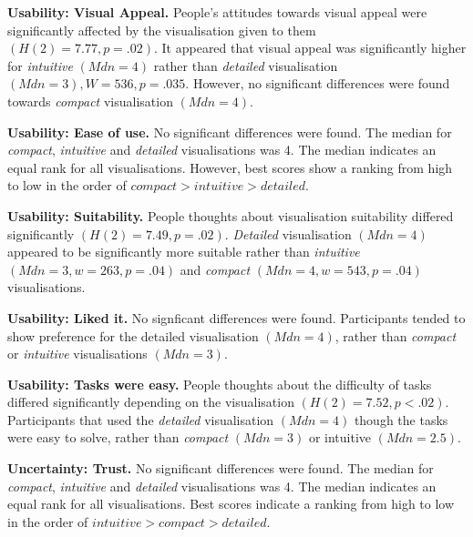 \documentclass[final,5p,times,twocolumn,authoryear]{elsarticle}
\begin{document}

\textbf{Usability: Visual Appeal.} People's attitudes towards visual appeal were significantly affected by the visualisation given to them $(H(2) = 7.77, p  = .02)$. It appeared that visual appeal was significantly higher for \emph{intuitive}  $(Mdn = 4)$ rather than \emph{detailed} visualisation $(Mdn = 3),  W = 536, p = .035$. However, no significant differences were found towards \emph{compact} visualisation $(Mdn = 4)$.

\textbf{Usability: Ease of use.} No significant differences were found. The median for \emph{compact}, \emph{intuitive} and \emph{detailed} visualisations was 4. The median indicates an equal rank for all visualisations. However, best scores show a ranking from high to low in the order of $compact > intuitive > detailed$.


\textbf{Usability: Suitability.} People thoughts about visualisation suitability differed significantly $(H(2) = 7.49, p = .02)$.  \emph{Detailed} visualisation $(Mdn = 4)$ appeared to be significantly more suitable rather than \emph{intuitive} $(Mdn = 3, w = 263, p = .04)$ and \emph{compact} $(Mdn = 4, w = 543, p = .04)$ visualisations.

\textbf{Usability: Liked it.} No signficant differences were found. Participants tended to show preference for the detailed visualisation $(Mdn = 4)$, rather than \emph{compact} or \emph{intuitive} visualisations $(Mdn = 3)$. 

\textbf{Usability: Tasks were easy.} People thoughts about the difficulty of tasks differed significantly depending on the visualisation $(H(2) = 7.52, p < .02)$. Participants that used the \emph{detailed} visualisation $(Mdn = 4)$ though the tasks were easy to solve, rather than \emph{compact} $(Mdn = 3)$ or intuitive $(Mdn = 2.5)$.



\textbf{Uncertainty: Trust.} No significant differences were found. The median for \emph{compact}, \emph{intuitive} and \emph{detailed} visualisations was 4. The median indicates an equal rank for all visualisations. Best scores indicate a ranking from high to low in the order of $intuitive > compact > detailed$.
\end{document}
